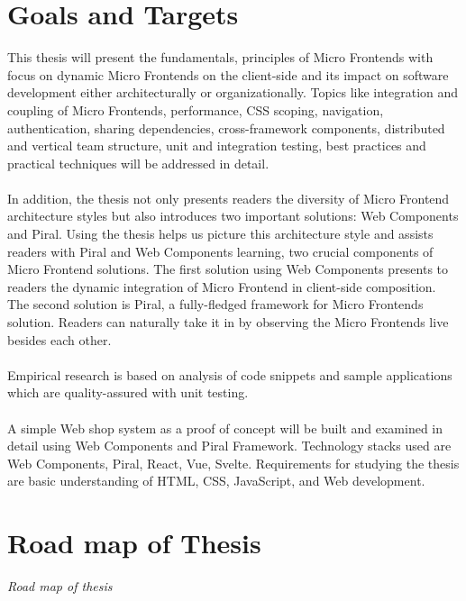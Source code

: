 \documentclass[a4paper]{book}
\begin{document}
\section{Goals and Targets}
This thesis will present the fundamentals,  principles of Micro Frontends with focus on dynamic Micro Frontends on the client-side and its impact on software development either architecturally or organizationally. Topics like integration and coupling of Micro Frontends, performance, CSS scoping, navigation, authentication, sharing dependencies, cross-framework components, distributed and vertical team structure, unit and integration testing, best practices and practical techniques will be addressed in detail. 
\\
\\
In addition, the thesis not only presents readers the diversity of Micro Frontend architecture styles but also introduces two important solutions: Web Components and Piral. Using the thesis helps us picture this architecture style and assists readers with Piral and Web Components learning, two crucial components of Micro Frontend solutions. The first solution using Web Components presents to readers the dynamic integration of Micro Frontend in client-side composition. The second solution is Piral, a fully-fledged framework for Micro Frontends solution. Readers can naturally take it in by observing the Micro Frontends live besides each other.
\\ \\
Empirical research is based on analysis of code snippets and sample applications which are quality-assured with unit testing. 
\\
\\
A simple Web shop system as a proof of concept will be built and examined in detail using Web Components and Piral Framework. Technology stacks used are Web Components, Piral, React, Vue, Svelte. Requirements for studying the thesis are basic understanding of HTML, CSS, JavaScript, and Web development.

\section{Road map of Thesis }
 \textit{Road map of thesis}
\end{document}
